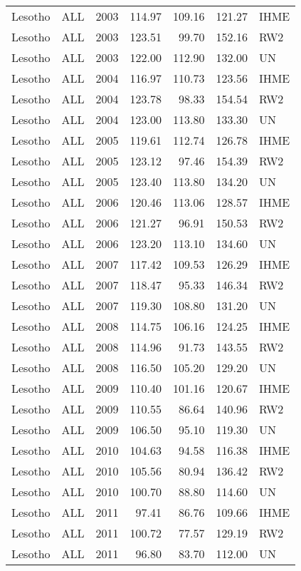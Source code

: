 \begin{longtable}{lllrrrl}
  Lesotho & ALL & 2003 & 114.97 & 109.16 & 121.27 & IHME \\ 
  Lesotho & ALL & 2003 & 123.51 & 99.70 & 152.16 & RW2 \\ 
  Lesotho & ALL & 2003 & 122.00 & 112.90 & 132.00 & UN \\ 
  Lesotho & ALL & 2004 & 116.97 & 110.73 & 123.56 & IHME \\ 
  Lesotho & ALL & 2004 & 123.78 & 98.33 & 154.54 & RW2 \\ 
  Lesotho & ALL & 2004 & 123.00 & 113.80 & 133.30 & UN \\ 
  Lesotho & ALL & 2005 & 119.61 & 112.74 & 126.78 & IHME \\ 
  Lesotho & ALL & 2005 & 123.12 & 97.46 & 154.39 & RW2 \\ 
  Lesotho & ALL & 2005 & 123.40 & 113.80 & 134.20 & UN \\ 
  Lesotho & ALL & 2006 & 120.46 & 113.06 & 128.57 & IHME \\ 
  Lesotho & ALL & 2006 & 121.27 & 96.91 & 150.53 & RW2 \\ 
  Lesotho & ALL & 2006 & 123.20 & 113.10 & 134.60 & UN \\ 
  Lesotho & ALL & 2007 & 117.42 & 109.53 & 126.29 & IHME \\ 
  Lesotho & ALL & 2007 & 118.47 & 95.33 & 146.34 & RW2 \\ 
  Lesotho & ALL & 2007 & 119.30 & 108.80 & 131.20 & UN \\ 
  Lesotho & ALL & 2008 & 114.75 & 106.16 & 124.25 & IHME \\ 
  Lesotho & ALL & 2008 & 114.96 & 91.73 & 143.55 & RW2 \\ 
  Lesotho & ALL & 2008 & 116.50 & 105.20 & 129.20 & UN \\ 
  Lesotho & ALL & 2009 & 110.40 & 101.16 & 120.67 & IHME \\ 
  Lesotho & ALL & 2009 & 110.55 & 86.64 & 140.96 & RW2 \\ 
  Lesotho & ALL & 2009 & 106.50 & 95.10 & 119.30 & UN \\ 
  Lesotho & ALL & 2010 & 104.63 & 94.58 & 116.38 & IHME \\ 
  Lesotho & ALL & 2010 & 105.56 & 80.94 & 136.42 & RW2 \\ 
  Lesotho & ALL & 2010 & 100.70 & 88.80 & 114.60 & UN \\ 
  Lesotho & ALL & 2011 & 97.41 & 86.76 & 109.66 & IHME \\ 
  Lesotho & ALL & 2011 & 100.72 & 77.57 & 129.19 & RW2 \\ 
  Lesotho & ALL & 2011 & 96.80 & 83.70 & 112.00 & UN \\ 

\end{longtable}
